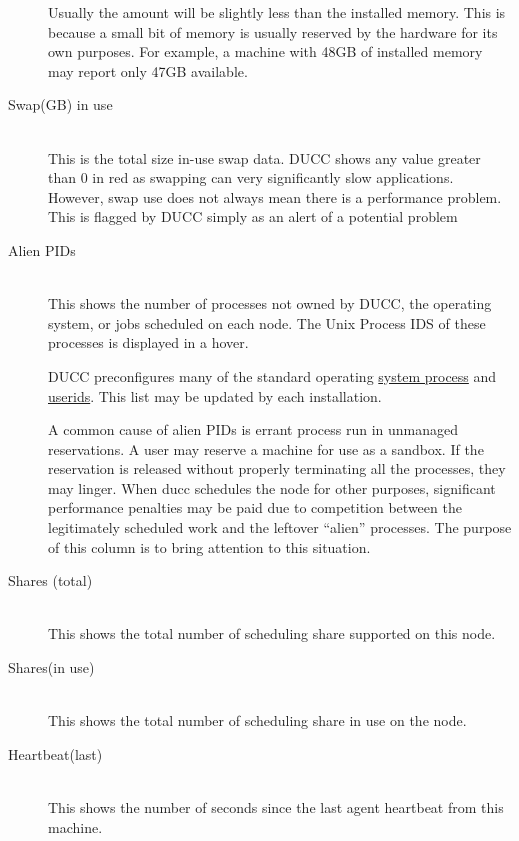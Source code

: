 \begin{description}
        Usually the amount will be slightly less than the installed memory.  This is because
        a small bit of memory is usually reserved by the hardware for its own purposes.  For 
        example, a machine with 48GB of installed memory may report only 47GB available.

      \item[Swap(GB) in use] \hfill \\
        This is the total size in-use swap data.  DUCC shows any value greater than 0 in
        red as swapping can very significantly slow applications.  However, swap use does
        not always mean there is a performance problem.  This is flagged by DUCC simply
        as an alert of a potential problem

      \item[Alien PIDs] \hfill \\
        This shows the number of processes not owned by DUCC, the operating system, or
        jobs scheduled on each node.  The Unix Process IDS of these processes is displayed
        in a hover.

        DUCC preconfigures many of the standard operating 
        \hyperref[itm:props-rogue.process]{system process} and 
        \hyperref[itm:props-rogue.user]{userids}.  This list may be updated by each
        installation.

        A common cause of alien PIDs is errant process run in unmanaged reservations.  A
        user may reserve a machine for use as a sandbox.  If the reservation is released
        without properly terminating all the processes, they may linger.  When ducc 
        schedules the node for other purposes, significant performance penalties may be
        paid due to competition between the legitimately scheduled work and the leftover
        ``alien'' processes.  The purpose of this column is to bring attention to this situation.

      \item[Shares (total)] \hfill \\
        This shows the total number of scheduling share supported on this node.

      \item[Shares(in use)] \hfill \\
        This shows the total number of scheduling share in use on the node.

      \item[Heartbeat(last)] \hfill \\
        This shows the number of seconds since the last agent heartbeat from this machine.

      \end{description}
      
